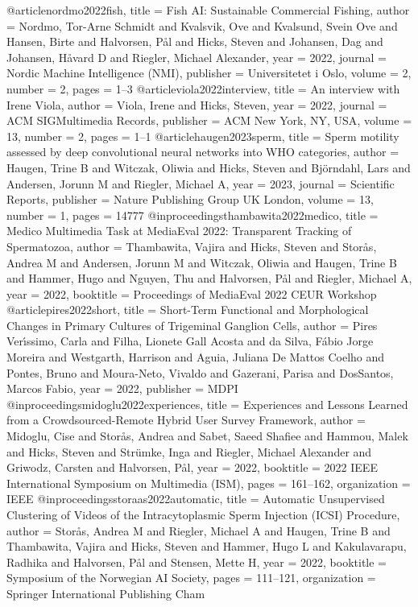 @article{nordmo2022fish,
	title = {Fish AI: Sustainable Commercial Fishing},
	author = {Nordmo, Tor-Arne Schmidt and Kvalsvik, Ove and Kvalsund, Svein Ove and Hansen, Birte and Halvorsen, P{\aa}l and Hicks, Steven and Johansen, Dag and Johansen, H{\aa}vard D and Riegler, Michael Alexander},
	year = 2022,
	journal = {Nordic Machine Intelligence (NMI)},
	publisher = {Universitetet i Oslo},
	volume = 2,
	number = 2,
	pages = {1--3}
}
@article{viola2022interview,
	title = {An interview with Irene Viola},
	author = {Viola, Irene and Hicks, Steven},
	year = 2022,
	journal = {ACM SIGMultimedia Records},
	publisher = {ACM New York, NY, USA},
	volume = 13,
	number = 2,
	pages = {1--1}
}
@article{haugen2023sperm,
	title = {Sperm motility assessed by deep convolutional neural networks into WHO categories},
	author = {Haugen, Trine B and Witczak, Oliwia and Hicks, Steven and Bj{\"o}rndahl, Lars and Andersen, Jorunn M and Riegler, Michael A},
	year = 2023,
	journal = {Scientific Reports},
	publisher = {Nature Publishing Group UK London},
	volume = 13,
	number = 1,
	pages = 14777
}
@inproceedings{thambawita2022medico,
	title = {Medico Multimedia Task at MediaEval 2022: Transparent Tracking of Spermatozoa},
	author = {Thambawita, Vajira and Hicks, Steven and Stor{\aa}s, Andrea M and Andersen, Jorunn M and Witczak, Oliwia and Haugen, Trine B and Hammer, Hugo and Nguyen, Thu and Halvorsen, P{\aa}l and Riegler, Michael A},
	year = 2022,
	booktitle = {Proceedings of MediaEval 2022 CEUR Workshop}
}
@article{pires2022short,
	title = {Short-Term Functional and Morphological Changes in Primary Cultures of Trigeminal Ganglion Cells},
	author = {Pires Ver{\'\i}ssimo, Carla and Filha, Lionete Gall Acosta and da Silva, F{\'a}bio Jorge Moreira and Westgarth, Harrison and Aguia, Juliana De Mattos Coelho and Pontes, Bruno and Moura-Neto, Vivaldo and Gazerani, Parisa and DosSantos, Marcos Fabio},
	year = 2022,
	publisher = {MDPI}
}
@inproceedings{midoglu2022experiences,
	title = {Experiences and Lessons Learned from a Crowdsourced-Remote Hybrid User Survey Framework},
	author = {Midoglu, Cise and Stor{\aa}s, Andrea and Sabet, Saeed Shafiee and Hammou, Malek and Hicks, Steven and Str{\"u}mke, Inga and Riegler, Michael Alexander and Griwodz, Carsten and Halvorsen, P{\aa}l},
	year = 2022,
	booktitle = {2022 IEEE International Symposium on Multimedia (ISM)},
	pages = {161--162},
	organization = {IEEE}
}
@inproceedings{storaas2022automatic,
	title = {Automatic Unsupervised Clustering of Videos of the Intracytoplasmic Sperm Injection (ICSI) Procedure},
	author = {Stor{\aa}s, Andrea M and Riegler, Michael A and Haugen, Trine B and Thambawita, Vajira and Hicks, Steven and Hammer, Hugo L and Kakulavarapu, Radhika and Halvorsen, P{\aa}l and Stensen, Mette H},
	year = 2022,
	booktitle = {Symposium of the Norwegian AI Society},
	pages = {111--121},
	organization = {Springer International Publishing Cham}
}

